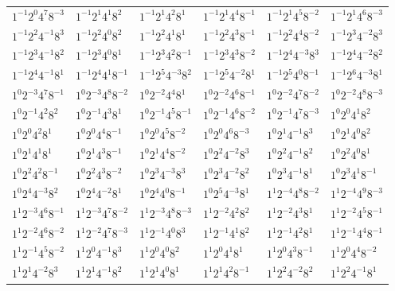 \documentclass[12pt]{amsart}
\numberwithin{equation}{section}
\theoremstyle{plain}
\theoremstyle{definition}
\theoremstyle{remark}
\begin{document}
\begin{longtable}{llllll}
$1^{-1}2^{0}4^{7}8^{-3}$ & $1^{-1}2^{1}4^{1}8^{2}$ & $1^{-1}2^{1}4^{2}8^{1}$ & $1^{-1}2^{1}4^{4}8^{-1}$ & $1^{-1}2^{1}4^{5}8^{-2}$ & $1^{-1}2^{1}4^{6}8^{-3}$\\
$1^{-1}2^{2}4^{-1}8^{3}$ & $1^{-1}2^{2}4^{0}8^{2}$ & $1^{-1}2^{2}4^{1}8^{1}$ & $1^{-1}2^{2}4^{3}8^{-1}$ & $1^{-1}2^{2}4^{4}8^{-2}$ & $1^{-1}2^{3}4^{-2}8^{3}$\\
$1^{-1}2^{3}4^{-1}8^{2}$ & $1^{-1}2^{3}4^{0}8^{1}$ & $1^{-1}2^{3}4^{2}8^{-1}$ & $1^{-1}2^{3}4^{3}8^{-2}$ & $1^{-1}2^{4}4^{-3}8^{3}$ & $1^{-1}2^{4}4^{-2}8^{2}$\\
$1^{-1}2^{4}4^{-1}8^{1}$ & $1^{-1}2^{4}4^{1}8^{-1}$ & $1^{-1}2^{5}4^{-3}8^{2}$ & $1^{-1}2^{5}4^{-2}8^{1}$ & $1^{-1}2^{5}4^{0}8^{-1}$ & $1^{-1}2^{6}4^{-3}8^{1}$\\
$1^{0}2^{-3}4^{7}8^{-1}$ & $1^{0}2^{-3}4^{8}8^{-2}$ & $1^{0}2^{-2}4^{4}8^{1}$ & $1^{0}2^{-2}4^{6}8^{-1}$ & $1^{0}2^{-2}4^{7}8^{-2}$ & $1^{0}2^{-2}4^{8}8^{-3}$\\
$1^{0}2^{-1}4^{2}8^{2}$ & $1^{0}2^{-1}4^{3}8^{1}$ & $1^{0}2^{-1}4^{5}8^{-1}$ & $1^{0}2^{-1}4^{6}8^{-2}$ & $1^{0}2^{-1}4^{7}8^{-3}$ & $1^{0}2^{0}4^{1}8^{2}$\\
$1^{0}2^{0}4^{2}8^{1}$ & $1^{0}2^{0}4^{4}8^{-1}$ & $1^{0}2^{0}4^{5}8^{-2}$ & $1^{0}2^{0}4^{6}8^{-3}$ & $1^{0}2^{1}4^{-1}8^{3}$ & $1^{0}2^{1}4^{0}8^{2}$\\
$1^{0}2^{1}4^{1}8^{1}$ & $1^{0}2^{1}4^{3}8^{-1}$ & $1^{0}2^{1}4^{4}8^{-2}$ & $1^{0}2^{2}4^{-2}8^{3}$ & $1^{0}2^{2}4^{-1}8^{2}$ & $1^{0}2^{2}4^{0}8^{1}$\\
$1^{0}2^{2}4^{2}8^{-1}$ & $1^{0}2^{2}4^{3}8^{-2}$ & $1^{0}2^{3}4^{-3}8^{3}$ & $1^{0}2^{3}4^{-2}8^{2}$ & $1^{0}2^{3}4^{-1}8^{1}$ & $1^{0}2^{3}4^{1}8^{-1}$\\
$1^{0}2^{4}4^{-3}8^{2}$ & $1^{0}2^{4}4^{-2}8^{1}$ & $1^{0}2^{4}4^{0}8^{-1}$ & $1^{0}2^{5}4^{-3}8^{1}$ & $1^{1}2^{-4}4^{8}8^{-2}$ & $1^{1}2^{-4}4^{9}8^{-3}$\\
$1^{1}2^{-3}4^{6}8^{-1}$ & $1^{1}2^{-3}4^{7}8^{-2}$ & $1^{1}2^{-3}4^{8}8^{-3}$ & $1^{1}2^{-2}4^{2}8^{2}$ & $1^{1}2^{-2}4^{3}8^{1}$ & $1^{1}2^{-2}4^{5}8^{-1}$\\
$1^{1}2^{-2}4^{6}8^{-2}$ & $1^{1}2^{-2}4^{7}8^{-3}$ & $1^{1}2^{-1}4^{0}8^{3}$ & $1^{1}2^{-1}4^{1}8^{2}$ & $1^{1}2^{-1}4^{2}8^{1}$ & $1^{1}2^{-1}4^{4}8^{-1}$\\
$1^{1}2^{-1}4^{5}8^{-2}$ & $1^{1}2^{0}4^{-1}8^{3}$ & $1^{1}2^{0}4^{0}8^{2}$ & $1^{1}2^{0}4^{1}8^{1}$ & $1^{1}2^{0}4^{3}8^{-1}$ & $1^{1}2^{0}4^{4}8^{-2}$\\
$1^{1}2^{1}4^{-2}8^{3}$ & $1^{1}2^{1}4^{-1}8^{2}$ & $1^{1}2^{1}4^{0}8^{1}$ & $1^{1}2^{1}4^{2}8^{-1}$ & $1^{1}2^{2}4^{-2}8^{2}$ & $1^{1}2^{2}4^{-1}8^{1}$\\

\end{longtable}
\end{document}
